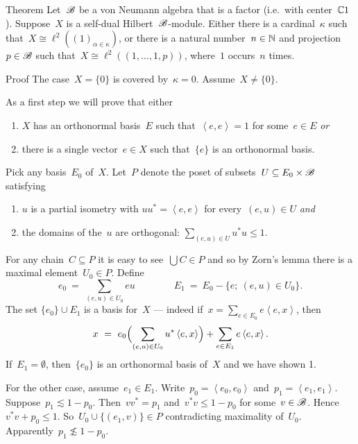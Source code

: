\documentclass[b]{subfiles}
\begin{document}
\begin{parsec}
\begin{point}{Theorem}%
Let~$\mathscr{B}$ be a von Neumann algebra that is a factor (i.e.~with center~$\mathbb{C} 1$).
Suppose~$X$ is a self-dual Hilbert~$\mathscr{B}$-module.
Either there is a cardinal~$\kappa$
    such that~$X \cong \ell^2((1)_{\alpha \in \kappa})$,
    or there is a natural number~$n\in \mathbb{N}$
    and projection~$p \in \mathscr{B}$
    such that~$X \cong \ell^2((1, \ldots, 1, p))$,
    where~$1$ occurs~$n$ times.
\begin{point}{Proof}%
The case~$X = \{0\}$ is covered by~$\kappa=0$.
Assume~$X \neq \{0\}$.
\begin{point}%
As a first step we will prove that
either
\begin{enumerate}
\item $X$ has an orthonormal basis~$E$
    such that~$\left<e,e\right>=1$ for some~$e \in E$ \emph{or}
\item there is a single vector~$e \in X$ such that~$\{e\}$ is an orthonormal basis.
\end{enumerate}
Pick any basis~$E_0$ of~$X$.
Let~$P$ denote the poset of subsets~$U \subseteq E_0 \times \mathscr{B}$
    satisfying
\begin{enumerate}
    \item
    $u$ is a partial isometry with $uu^* = \left<e,e\right>$
        for every~$(e,u) \in U$ \emph{and}
    \item
    the domains of the~$u$ are orthogonal:  $\sum_{(e,u) \in U} u^*u \leq 1$.
\end{enumerate}
For any chain~$C \subseteq P$
    it is easy to see~$\bigcup C \in P$
    and so by Zorn's lemma
    there is a maximal element~$U_0 \in P$.
Define
\begin{equation*}
e_0 \ =\  \sum_{(e,u) \in U_0} eu \qquad \qquad E_1 \ = \ E_0 - \{e;\ (e,u) \in U_0\}.
\end{equation*}
The set $\{e_0\} \cup E_1$ is a basis for~$X$ ---
    indeed if~$x = \sum_{e \in E_0} e \left<e,x\right>$,
    then
\begin{equation*}
    x \ =\  e_0 \Bigl(\sum_{(e,u) \in U_0} u^*\left<e,x\right>\Bigr)
            + \sum_{e \in E_1} e\left<e,x\right>.
\end{equation*}
If~$E_1 = \emptyset$, then~$\{e_0\}$ is an orthonormal basis of~$X$ and
    we have shown 1. 

For the other case, assume~$e_1 \in E_1$.
Write~$p_0 = \left<e_0,e_0\right>$
    and~$p_1 = \left<e_1,e_1\right>$.
Suppose~$p_1 \lesssim 1 - p_0$.
Then~$vv^* = p_1$ and~$v^*v \leq 1- p_0$ for some~$v \in \mathscr{B}$.
    Hence~$v^*v + p_0 \leq 1$.
    So~$U_0 \cup \{ (e_1, v) \} \in P$ contradicting maximality of~$U_0$.
Apparently~$p_1 \not\lesssim 1-p_0$.


\end{point}
\end{point}
\end{point}
\end{parsec}
\end{document}
